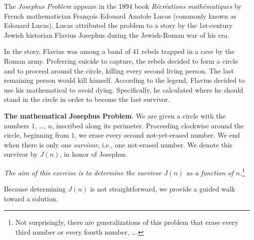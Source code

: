 \begin{enumerate}
The {\it Josephus Problem} appears in the 1894 book \textit{R\'ecr\'eations math\'ematiques} by 
French mathematician Fran\c{c}ois Edouard Anatole Lucas (commonly known as Edouard Lucas).  Lucas attributed the problem to a story by the 1st-century Jewish historian Flavius Josephus during the Jewish-Roman war of his era.

\smallskip

In the story, Flavius was among a band of 41 rebels trapped in a cave by the Roman army.  Preferring suicide to capture, the rebels decided to form a circle and to proceed around the circle, killing every second living person.  The last remaining person would kill himself.  According to the legend, Flavius decided to use his mathematical to avoid dying.  Specifically, he calculated where he should stand in the circle in order to become the last survivor.

\medskip

{\bf  The  mathematical Josephus Problem}.
We are given a circle with the numbers $1$, \ldots, $n$, inscribed along its perimeter.  Proceeding clockwise around the circle, beginning from $1$, we erase every second not-yet-erased number.  We end when there is only one {\it survivor}, i.e., one not-erased number.  We denote this survivor by $J(n)$, in honor of Josephus.


\medskip

{\em The aim of this exercise is to determine the survivor $J(n)$ as a function of $n$.}\footnote{Not surprisingly, there are generalizations of this problem that erase every third number or every fourth number, \ldots .}

\medskip

Because determining $J(n)$ is not straightforward, we provide a guided walk toward a solution.

\smallskip   


\end{enumerate}
